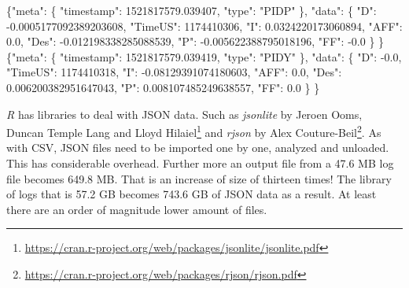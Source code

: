 \documentclass[12pt,oneside]{reedthesis}
\newenvironment{Shaded}{\begin{snugshade}}{\end{snugshade}}
\newcommand{\DataTypeTok}[1]{\textcolor[rgb]{0.13,0.29,0.53}{#1}}
\newcommand{\DecValTok}[1]{\textcolor[rgb]{0.00,0.00,0.81}{#1}}
\newcommand{\FloatTok}[1]{\textcolor[rgb]{0.00,0.00,0.81}{#1}}
\newcommand{\StringTok}[1]{\textcolor[rgb]{0.31,0.60,0.02}{#1}}
\newcommand{\FunctionTok}[1]{\textcolor[rgb]{0.00,0.00,0.00}{#1}}
\theoremstyle{definition}
\theoremstyle{definition}
\theoremstyle{definition}
\theoremstyle{remark}
\begin{document}
\begin{Shaded}
\begin{Highlighting}[]
\FunctionTok{\{}\DataTypeTok{"meta"}\FunctionTok{:} \FunctionTok{\{}
    \DataTypeTok{"timestamp"}\FunctionTok{:} \FloatTok{1521817579.039407}\FunctionTok{,} 
    \DataTypeTok{"type"}\FunctionTok{:} \StringTok{"PIDP"}
  \FunctionTok{\},} 
  \DataTypeTok{"data"}\FunctionTok{:} \FunctionTok{\{}
    \DataTypeTok{"D"}\FunctionTok{:} \FloatTok{-0.0005177092389203608}\FunctionTok{,} 
    \DataTypeTok{"TimeUS"}\FunctionTok{:} \DecValTok{1174410306}\FunctionTok{,} 
    \DataTypeTok{"I"}\FunctionTok{:} \FloatTok{0.0324220173060894}\FunctionTok{,} 
    \DataTypeTok{"AFF"}\FunctionTok{:} \FloatTok{0.0}\FunctionTok{,} 
    \DataTypeTok{"Des"}\FunctionTok{:} \FloatTok{-0.012198338285088539}\FunctionTok{,} 
    \DataTypeTok{"P"}\FunctionTok{:} \FloatTok{-0.005622388795018196}\FunctionTok{,} 
    \DataTypeTok{"FF"}\FunctionTok{:} \FloatTok{-0.0}
  \FunctionTok{\}}
\FunctionTok{\}}
\FunctionTok{\{}\DataTypeTok{"meta"}\FunctionTok{:} \FunctionTok{\{}
    \DataTypeTok{"timestamp"}\FunctionTok{:} \FloatTok{1521817579.039419}\FunctionTok{,} 
    \DataTypeTok{"type"}\FunctionTok{:} \StringTok{"PIDY"}
  \FunctionTok{\},} 
  \DataTypeTok{"data"}\FunctionTok{:} \FunctionTok{\{}
    \DataTypeTok{"D"}\FunctionTok{:} \FloatTok{-0.0}\FunctionTok{,} 
    \DataTypeTok{"TimeUS"}\FunctionTok{:} \DecValTok{1174410318}\FunctionTok{,} 
    \DataTypeTok{"I"}\FunctionTok{:} \FloatTok{-0.08129391074180603}\FunctionTok{,} 
    \DataTypeTok{"AFF"}\FunctionTok{:} \FloatTok{0.0}\FunctionTok{,} 
    \DataTypeTok{"Des"}\FunctionTok{:} \FloatTok{0.006200382951647043}\FunctionTok{,} 
    \DataTypeTok{"P"}\FunctionTok{:} \FloatTok{0.008107485249638557}\FunctionTok{,} 
    \DataTypeTok{"FF"}\FunctionTok{:} \FloatTok{0.0}
  \FunctionTok{\}}
\FunctionTok{\}}
\end{Highlighting}
\end{Shaded}
\emph{R} has libraries to deal with JSON data. Such as \emph{jsonlite}
by Jeroen Ooms, Duncan Temple Lang and Lloyd Hilaiel\footnote{\url{https://cran.r-project.org/web/packages/jsonlite/jsonlite.pdf}}
and \emph{rjson} by Alex Couture-Beil\footnote{\url{https://cran.r-project.org/web/packages/rjson/rjson.pdf}}.
As with CSV, JSON files need to be imported one by one, analyzed and
unloaded. This has considerable overhead. Further more an output file
from a 47.6 MB log file becomes 649.8 MB. That is an increase of size of
thirteen times! The library of logs that is 57.2 GB becomes 743.6 GB of
JSON data as a result. At least there are an order of magnitude lower
amount of files.
\end{document}
